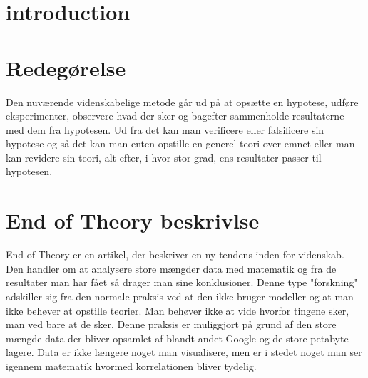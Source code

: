 \section{introduction}


\section{Redegørelse}
Den nuværende videnskabelige metode går ud på at opsætte en hypotese, udføre eksperimenter, observere hvad der sker og bagefter sammenholde resultaterne med dem fra hypotesen. Ud fra det kan man verificere eller falsificere sin hypotese og så det kan man enten opstille en generel teori over emnet eller man kan revidere sin teori, alt efter, i hvor stor grad, ens resultater passer til hypotesen. 

\section{End of Theory beskrivlse}
End of Theory er en artikel, der beskriver en ny tendens inden for videnskab. Den handler om at analysere store mængder data med matematik og fra de resultater man har fået så drager man sine konklusioner. Denne type "forskning" adskiller sig fra den normale praksis ved at den ikke bruger modeller og at man ikke behøver at opstille teorier. Man behøver ikke at vide hvorfor tingene sker, man ved bare at de sker. Denne praksis er muliggjort på grund af den store mængde data der bliver opsamlet af blandt andet Google og de store petabyte lagere. Data er ikke længere noget man visualisere, men er i stedet noget man ser igennem matematik hvormed korrelationen bliver tydelig.

